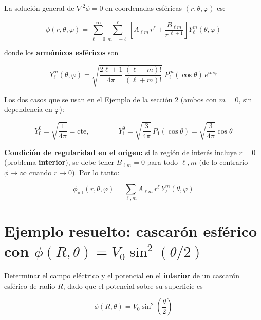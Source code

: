 \documentclass[a4paper]{article}
\begin{document}
La solución general de $\nabla^2\phi=0$ en coordenadas esféricas $(r,\theta,\varphi)$ es:

\[
\phi(r,\theta,\varphi)=\sum_{\ell=0}^{\infty}\sum_{m=-\ell}^{\ell}\left[A_{\ell m}\,r^{\ell}+\frac{B_{\ell m}}{r^{\,\ell+1}}\right]Y_\ell^m(\theta,\varphi)
\]


donde los \textbf{armónicos esféricos} son

\[
Y_\ell^m(\theta,\varphi)=\sqrt{\frac{2\ell+1}{4\pi}\,\frac{(\ell-m)!}{(\ell+m)!}}\;P_\ell^{m}(\cos\theta)\,e^{im\varphi}
\]


Los dos casos que se usan en el Ejemplo de la sección 2 (ambos con $m=0$, sin dependencia en $\varphi$):

\[
Y_0^0=\sqrt{\frac{1}{4\pi}}=\text{cte}, \qquad\qquad Y_1^0=\sqrt{\frac{3}{4\pi}}\,P_1(\cos\theta)=\sqrt{\frac{3}{4\pi}}\cos\theta
\]


\textbf{Condición de regularidad en el origen:} si la región de interés incluye $r=0$ (problema \textbf{interior}), se debe tener $B_{\ell m}=0$ para todo $\ell,m$ (de lo contrario $\phi\to\infty$ cuando $r\to0$). Por lo tanto:

\[
\phi_{\text{int}}(r,\theta,\varphi)=\sum_{\ell,m}A_{\ell m}\,r^{\ell}\,Y_\ell^m(\theta,\varphi)\tag{1}
\]


\medskip


\section{Ejemplo resuelto: cascarón esférico con $\phi(R,\theta)=V_0\sin^2(\theta/2)$}


Determinar el campo eléctrico y el potencial en el \textbf{interior} de un cascarón esférico de radio $R$, dado que el potencial sobre su superficie es

\[
\phi(R,\theta)=V_0\sin^2\!\left(\frac{\theta}{2}\right)
\]


\begin{center}
\end{center}
\end{document}
